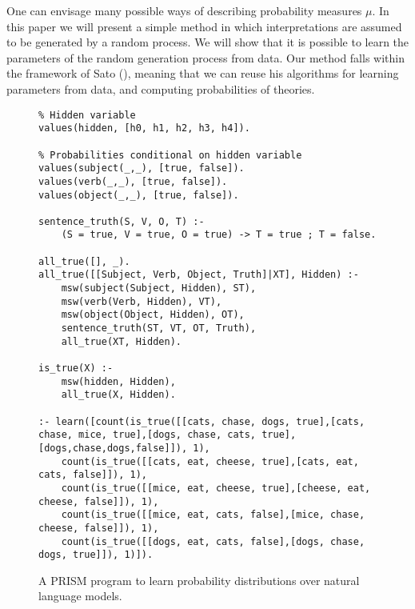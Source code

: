 \documentclass[letterpaper]{article}
\begin{document}
One can envisage many possible ways of describing probability measures
$\mu$. In this paper we will present a simple method in which
interpretations are assumed to be generated by a random process. We
will show that it is possible to learn the parameters of the random
generation process from data. Our method falls within the framework of
Sato (\citeyear{Sato:95}), meaning that we can reuse his algorithms
for learning parameters from data, and computing probabilities of
theories.

\begin{figure}
\begin{lstlisting}
% Hidden variable
values(hidden, [h0, h1, h2, h3, h4]).

% Probabilities conditional on hidden variable
values(subject(_,_), [true, false]).
values(verb(_,_), [true, false]).
values(object(_,_), [true, false]).

sentence_truth(S, V, O, T) :-
	(S = true, V = true, O = true) -> T = true ; T = false.

all_true([], _).
all_true([[Subject, Verb, Object, Truth]|XT], Hidden) :-
	msw(subject(Subject, Hidden), ST),
	msw(verb(Verb, Hidden), VT),
	msw(object(Object, Hidden), OT),
	sentence_truth(ST, VT, OT, Truth),
	all_true(XT, Hidden).

is_true(X) :-
	msw(hidden, Hidden),
	all_true(X, Hidden).

:- learn([count(is_true([[cats, chase, dogs, true],[cats, chase, mice, true],[dogs, chase, cats, true],[dogs,chase,dogs,false]]), 1),
	count(is_true([[cats, eat, cheese, true],[cats, eat, cats, false]]), 1),
	count(is_true([[mice, eat, cheese, true],[cheese, eat, cheese, false]]), 1),
	count(is_true([[mice, eat, cats, false],[mice, chase, cheese, false]]), 1),
	count(is_true([[dogs, eat, cats, false],[dogs, chase, dogs, true]]), 1)]).
\end{lstlisting}
\caption{A PRISM program to learn probability distributions over
  natural language models.}
\end{figure}




\end{document}
